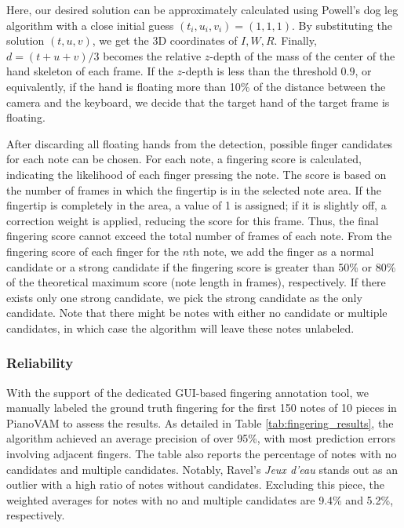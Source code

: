 \documentclass{article}
\begin{document}
Here, our desired solution can be approximately calculated using Powell's dog leg algorithm with a close initial guess $(t_i,u_i,v_i)=(1,1,1)$. By substituting the solution $(t,u,v)$, we get the 3D coordinates of $I,W,R$.  Finally, $d=(t+u+v)/3$ becomes the relative $z$-depth of the mass of the center of the hand skeleton of each frame. If the $z$-depth is less than the threshold $0.9$, or equivalently, if the hand is floating more than 10\% of the distance between the camera and the keyboard, we decide that the target hand of the target frame is floating.



After discarding all floating hands from the detection, possible finger candidates for each note can be chosen. For each note, a fingering score is calculated, indicating the likelihood of each finger pressing the note. The score is based on the number of frames in which the fingertip is in the selected note area. If the fingertip is completely in the area, a value of 1 is assigned; if it is slightly off, a correction weight is applied, reducing the score for this frame. Thus, the final fingering score cannot exceed the total number of frames of each note. From the fingering score of each finger for the $n$th note, we add the finger as a normal candidate or a strong candidate if the fingering score is greater than 50\% or 80\% of the theoretical maximum score (note length in frames), respectively. If there exists only one strong candidate, we pick the strong candidate as the only candidate. Note that there might be notes with either no candidate or multiple candidates, in which case the algorithm will leave these notes unlabeled.

\subsubsection{Reliability}
With the support of the dedicated GUI-based fingering annotation tool, we manually labeled the ground truth fingering for the first 150 notes of 10 pieces in PianoVAM to assess the results. As detailed in Table \ref{tab:fingering_results}, the algorithm achieved an average precision of over 95\%, with most prediction errors involving adjacent fingers. The table also reports the percentage of notes with no candidates and multiple candidates. Notably, Ravel's \textit{Jeux d'eau} stands out as an outlier with a high ratio of notes without candidates. Excluding this piece, the weighted averages for notes with no and multiple candidates are 9.4\% and 5.2\%, respectively.
\end{document}

